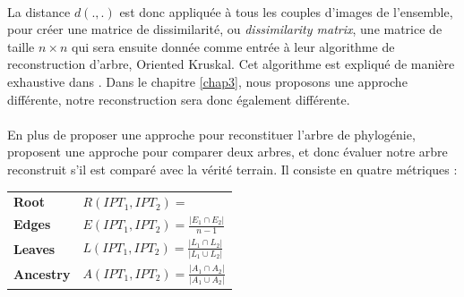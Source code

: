 \documentclass[utf8,final]{stageM2R} %
\begin{document}
\paragraph{}

La distance $d(.,.)$ est donc appliquée à tous les couples d'images de l'ensemble, pour créer une matrice de dissimilarité, ou \textit{dissimilarity matrix}, une matrice de taille $n\times n$ qui sera ensuite donnée comme entrée à leur algorithme de reconstruction d'arbre, Oriented Kruskal. Cet algorithme est expliqué de manière exhaustive dans \autocite{dias2012image}. Dans le chapitre \ref{chap3}, nous proposons une approche différente, notre reconstruction sera donc également différente. 
\paragraph{}                    

En plus de proposer une approche pour reconstituer l'arbre de phylogénie,  proposent une approche pour comparer deux arbres, et donc évaluer notre arbre reconstruit s'il est comparé avec la vérité terrain. Il consiste en quatre métriques : \\
\renewcommand{\arraystretch}{2}
\begin{tabular}{ll}
  \textbf{Root} & $
                  R(IPT_{1}, IPT_{2}) = $
                  \scalebox{0.65}{%
                  $
                  \begin{cases}
                    1 & if\ \texttt{Root(IPT}_{1}) = \texttt{Root(IPT}_{2}) \\
                    0 & Otherwise
                  \end{cases}
                        $} \\
  \textbf{Edges} & $E(IPT_{1}, IPT_{2}) = \frac{|E_{1} \cap E_{2}|} {n - 1}$ \\
  \textbf{Leaves} & $L(IPT_{1}, IPT_{2}) = \frac{|L_{1} \cap L_{2}|} {|L_{1} \cup L_{2}|}$ \\
  \textbf{Ancestry} & $A(IPT_{1}, IPT_{2}) = \frac{|A_{1} \cap A_{2}|} {|A_{1} \cup A_{2}|}$
\end{tabular}
\renewcommand{\arraystretch}{1.}
\paragraph{}
\end{document}
